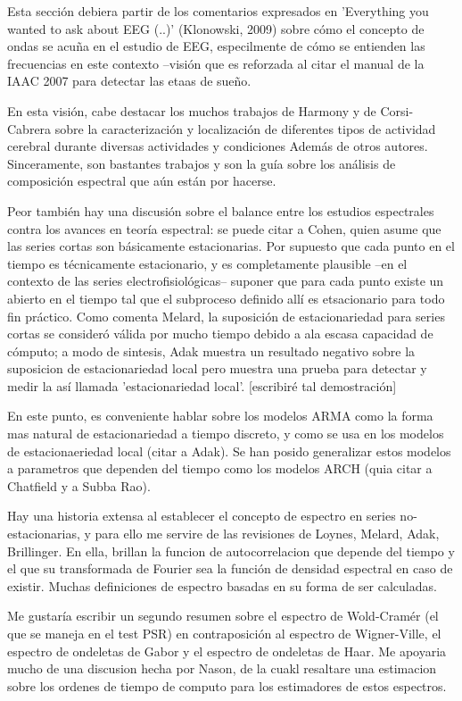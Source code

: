 Esta secci\'on debiera partir de los comentarios expresados 
en 'Everything you wanted to ask about EEG (..)'
(Klonowski, 2009) sobre c\'omo el concepto de ondas se acu\~na en el estudio de EEG, especilmente
de c\'omo se entienden las frecuencias en este contexto --visi\'on que es reforzada al citar
el manual de la IAAC 2007 para detectar las etaas de sue\~no.

En esta visi\'on, cabe destacar los muchos trabajos de Harmony y de Corsi-Cabrera
sobre la caracterizaci\'on y localizaci\'on de diferentes tipos de actividad cerebral 
durante diversas actividades y condiciones Adem\'as de otros autores. 
Sinceramente, son bastantes trabajos y
son la gu\'ia sobre los an\'alisis de composici\'on espectral que a\'un est\'an por hacerse.

Peor tambi\'en hay una discusi\'on sobre el balance entre los estudios espectrales contra
los avances en teor\'ia espectral: se puede citar a Cohen, quien asume que las series
cortas son b\'asicamente estacionarias. Por supuesto que cada punto en el tiempo es
t\'ecnicamente estacionario, y es completamente plausible --en el contexto de las series
electrofisiol\'ogicas-- suponer que para cada punto existe un abierto
en el tiempo tal que el subproceso definido all\'i es etsacionario para todo fin pr\'actico.
Como comenta Melard, la suposici\'on de estacionariedad para series cortas se 
consider\'o v\'alida por mucho tiempo debido a ala escasa capacidad de c\'omputo; a
modo de sintesis, Adak muestra un resultado negativo sobre la suposicion de estacionariedad
local pero muestra una prueba para detectar y medir la as\'i llamada 'estacionariedad local'.
[escribir\'e tal demostraci\'on]

En este punto, es conveniente hablar sobre los modelos ARMA como la forma mas natural de
estacionariedad a tiempo discreto, y como se usa en los modelos de estacionaeriedad 
local (citar a Adak). Se han posido generalizar estos modelos a parametros que
dependen del tiempo como los modelos ARCH (quia citar a Chatfield y a Subba Rao).

Hay una historia extensa al establecer el concepto de espectro en series no-estacionarias,
y para ello me servire de las revisiones de Loynes, Melard, Adak, Brillinger. En ella,
brillan la funcion de autocorrelacion que depende del tiempo y el que su transformada
de Fourier sea la funci\'on de densidad espectral en caso de existir. Muchas
definiciones de espectro basadas en su forma de ser calculadas.

Me gustar\'ia escribir un segundo resumen sobre el espectro de Wold-Cram\'er (el que se maneja
en el test PSR) en contraposici\'on al espectro de Wigner-Ville, el espectro de
ondeletas de Gabor y el espectro de ondeletas de Haar. Me apoyaria mucho de una discusion
hecha por Nason, de la cuakl resaltare una estimacion sobre los ordenes de tiempo de
computo para los estimadores de estos espectros.

